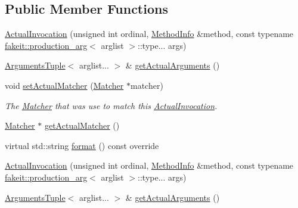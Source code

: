 \subsection*{Public Member Functions}
\begin{DoxyCompactItemize}
\item 
\mbox{\hyperlink{structfakeit_1_1ActualInvocation_a99175c134863f4d8320da8b5fe4bd223}{Actual\+Invocation}} (unsigned int ordinal, \mbox{\hyperlink{structfakeit_1_1MethodInfo}{Method\+Info}} \&method, const typename \mbox{\hyperlink{structfakeit_1_1production__arg}{fakeit\+::production\+\_\+arg}}$<$ arglist $>$\+::type... args)
\item 
\mbox{\hyperlink{namespacefakeit_a476a37a598825e1b5dd67b3a176491a1}{Arguments\+Tuple}}$<$ arglist... $>$ \& \mbox{\hyperlink{structfakeit_1_1ActualInvocation_a90b32ff4f76fa609de50d72792657207}{get\+Actual\+Arguments}} ()
\item 
void \mbox{\hyperlink{structfakeit_1_1ActualInvocation_abc95cd40eee8560cfcc69f0ab1c23713}{set\+Actual\+Matcher}} (\mbox{\hyperlink{structfakeit_1_1ActualInvocation_1_1Matcher}{Matcher}} $\ast$matcher)
\begin{DoxyCompactList}\small\item\em The \mbox{\hyperlink{structfakeit_1_1ActualInvocation_1_1Matcher}{Matcher}} that was use to match this \mbox{\hyperlink{structfakeit_1_1ActualInvocation}{Actual\+Invocation}}. \end{DoxyCompactList}\item 
\mbox{\hyperlink{structfakeit_1_1ActualInvocation_1_1Matcher}{Matcher}} $\ast$ \mbox{\hyperlink{structfakeit_1_1ActualInvocation_a656047cd638d3617bf9038d30aa6808b}{get\+Actual\+Matcher}} ()
\item 
virtual std\+::string \mbox{\hyperlink{structfakeit_1_1ActualInvocation_a84fc89352c4dfc5ff8b24239901f809a}{format}} () const override
\item 
\mbox{\hyperlink{structfakeit_1_1ActualInvocation_a99175c134863f4d8320da8b5fe4bd223}{Actual\+Invocation}} (unsigned int ordinal, \mbox{\hyperlink{structfakeit_1_1MethodInfo}{Method\+Info}} \&method, const typename \mbox{\hyperlink{structfakeit_1_1production__arg}{fakeit\+::production\+\_\+arg}}$<$ arglist $>$\+::type... args)
\item 
\mbox{\hyperlink{namespacefakeit_a476a37a598825e1b5dd67b3a176491a1}{Arguments\+Tuple}}$<$ arglist... $>$ \& \mbox{\hyperlink{structfakeit_1_1ActualInvocation_a90b32ff4f76fa609de50d72792657207}{get\+Actual\+Arguments}} ()
\item 

\end{DoxyCompactItemize}
